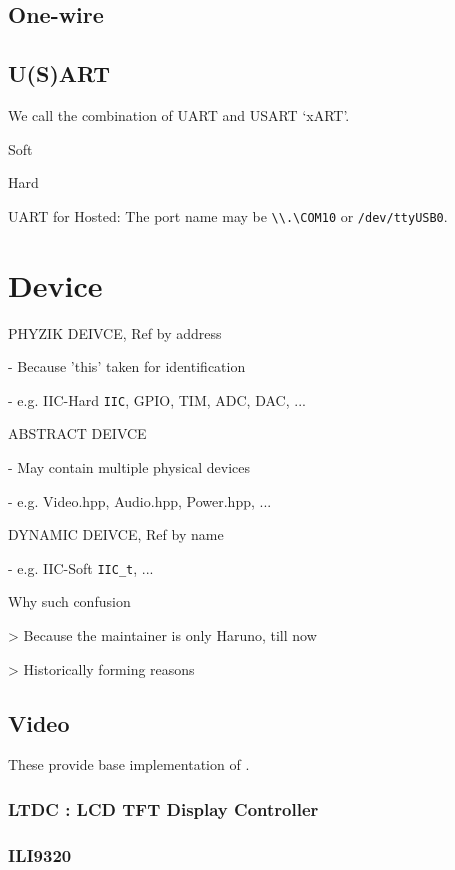 \subsection{One-wire}

\subsection{U(S)ART}

We call the combination of UART and USART `xART'. 

Soft

Hard

UART for Hosted:
The port name may be \verb`\\.\COM10` or \verb`/dev/ttyUSB0`.

\section{Device}

PHYZIK DEIVCE, Ref by address

- Because 'this' taken for identification

- e.g. IIC-Hard \verb`IIC`, GPIO, TIM, ADC, DAC, ...

ABSTRACT DEIVCE

- May contain multiple physical devices

- e.g. Video.hpp, Audio.hpp, Power.hpp, ...

DYNAMIC DEIVCE, Ref by name

- e.g. IIC-Soft \verb`IIC_t`, ...

Why such confusion

> Because the maintainer is only Haruno, till now

> Historically forming reasons

\subsection{Video}

These provide base implementation of .

\subsubsection{LTDC : LCD TFT Display Controller}

\subsubsection{ILI9320}
